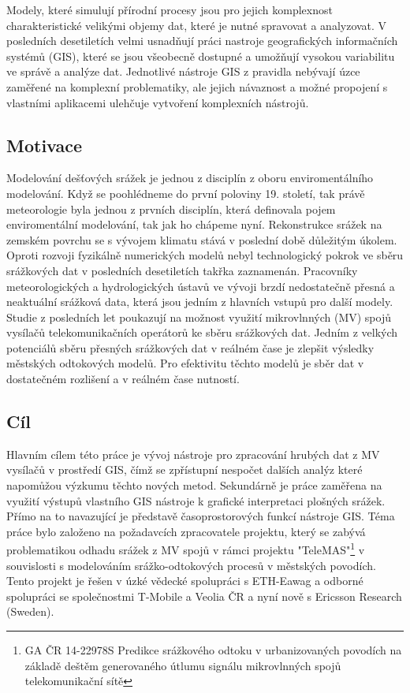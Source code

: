 \documentclass[a4paper,12pt,oneside]{report}
\begin{document}
Modely, které simulují přírodní procesy jsou pro jejich komplexnost charakteristické velikými objemy dat, které je nutné spravovat a analyzovat. V posledních desetiletích velmi usnadňují práci nastroje geografických informačních systémů (GIS), které se jsou všeobecně dostupné a umožňují vysokou variabilitu ve správě a analýze dat. Jednotlivé nástroje GIS z pravidla nebývají úzce zaměřené na komplexní problematiky, ale jejich návaznost a možné propojení s vlastními aplikacemi ulehčuje vytvoření komplexních nástrojů.

\subsection*{Motivace}
Modelování dešťových srážek je jednou z disciplín z oboru enviromentálního modelování. Když se poohlédneme do první poloviny 19. století, tak právě meteorologie byla jednou z prvních disciplín, která definovala pojem enviromentální modelování, tak jak ho chápeme nyní. Rekonstrukce srážek na zemském povrchu se s vývojem klimatu stává v poslední době důležitým úkolem. Oproti rozvoji fyzikálně numerických modelů nebyl technologický pokrok ve sběru srážkových dat v posledních desetiletích takřka zaznamenán. Pracovníky meteorologických a hydrologických ústavů ve vývoji brzdí nedostatečně přesná a neaktuální srážková data, která jsou jedním z hlavních vstupů pro další modely. Studie z posledních let poukazují na možnost využití mikrovlnných (MV) spojů vysílačů telekomunikačních operátorů ke sběru srážkových dat. Jedním z velkých  potenciálů sběru přesných srážkových dat v reálném čase je  zlepšit výsledky  městských odtokových modelů. Pro efektivitu těchto modelů je sběr dat v dostatečném rozlišení a v reálném čase nutností.

\subsection*{Cíl}
Hlavním cílem této práce je vývoj nástroje pro zpracování hrubých dat z MV vysílačů v prostředí GIS, čímž se zpřístupní nespočet dalších analýz které napomůžou výzkumu těchto nových metod. Sekundárně je práce zaměřena na využití výstupů vlastního GIS nástroje k grafické interpretaci plošných srážek. Přímo na to navazující je představě  časoprostorových funkcí nástroje GIS. Téma práce bylo založeno na požadavcích zpracovatele projektu, který se zabývá problematikou odhadu srážek z MV spojů v rámci projektu "TeleMAS"\footnote{GA ČR 14-22978S Predikce srážkového odtoku v urbanizovaných povodích na základě deštěm generovaného útlumu signálu mikrovlnných spojů telekomunikační sítě} v souvislosti s modelováním srážko-odtokových procesů v městských povodích. Tento projekt je řešen v úzké vědecké spolupráci s ETH-Eawag a odborné spolupráci se společnostmi T-Mobile a Veolia ČR a nyní nově s Ericsson Research (Sweden).
\end{document}
